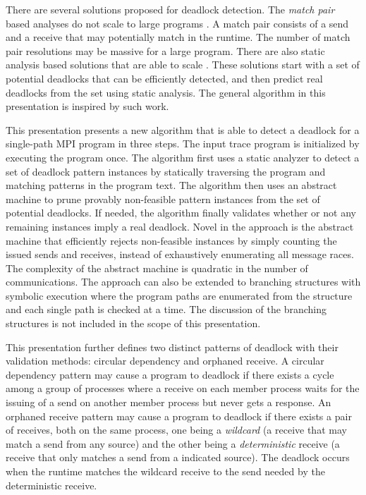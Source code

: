 There are several solutions proposed for deadlock detection. The \emph{match pair} based analyses do not scale to large programs \cite{DBLP:conf/ppopp/VakkalankaSGK08, DBLP:conf/sbmf/SharmaGB12, DBLP:conf/fm/ForejtKNS14}. A match pair consists of a send and a receive that may potentially match in the runtime. The number of match pair resolutions may be massive for a large program.
There are also static analysis based solutions that are able to scale \cite{DBLP:conf/sc/SharmaGB12, DBLP:conf/pldi/JoshiPSN09, Subodh:Dissertation}. These solutions start with a set of potential deadlocks that can be efficiently detected, and then predict real deadlocks from the set using static analysis.
The general algorithm in this presentation is inspired by such work.

This presentation presents a new algorithm that is able to detect a deadlock for a single-path MPI program in three steps. 
The input trace program is initialized by executing the program once.
The algorithm first uses a static analyzer to detect a set of deadlock pattern instances by statically traversing the program and matching patterns in the program text. The algorithm then uses an abstract machine to prune provably non-feasible pattern instances from the set of potential deadlocks. If needed, the algorithm finally validates whether or not any remaining instances imply a real deadlock. Novel in the approach is the abstract machine that efficiently rejects non-feasible instances by simply counting the issued sends and receives, instead of exhaustively enumerating all message races. The complexity of the abstract machine is quadratic in the number of communications. The approach can also be extended to branching structures with symbolic execution where the program paths are enumerated from the structure and each single path is checked at a time. The discussion of the branching structures is not included in the scope of this presentation.

This presentation further defines two distinct patterns of deadlock with their validation methods: circular dependency and orphaned receive. A circular dependency pattern may cause a program to deadlock if there exists a cycle among a group of processes where a receive on each member process waits for the issuing of a send on another member process but never gets a response. An orphaned receive pattern may cause a program to deadlock if there exists a pair of receives, both on the same process, one being a \emph{wildcard} (a receive that may match a send from any source) and the other being a \emph{deterministic} receive (a receive that only matches a send from a indicated source). The deadlock occurs when the runtime matches the wildcard receive to the send needed by the deterministic receive. 

